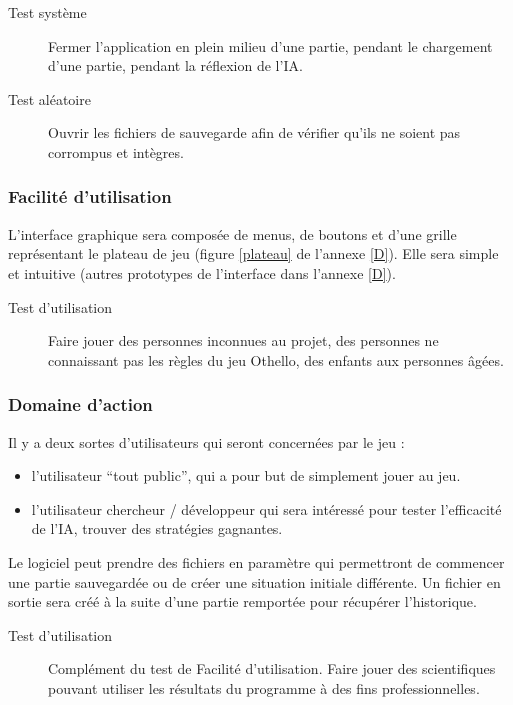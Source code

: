 \begin{description}
\item[Test système] Fermer l’application en plein milieu d’une partie, pendant le chargement d’une partie, pendant la réflexion de l’IA. 
\item[Test aléatoire] Ouvrir les fichiers de sauvegarde afin de vérifier qu’ils ne soient pas corrompus et intègres.
\end{description}

\subsubsection{Facilité d’utilisation}

L’interface graphique sera composée de menus, de boutons et d'une
grille représentant le plateau de jeu (figure \ref{plateau} de
l'annexe \ref{D}). Elle sera simple et intuitive
(autres prototypes de l'interface dans l'annexe \ref{D}).
 
\begin{description}
\item[Test d’utilisation] Faire jouer des personnes inconnues au projet, des personnes ne connaissant pas les règles du jeu Othello, des enfants aux personnes âgées. 
\end{description}

\subsubsection{Domaine d’action}

Il y a deux sortes d’utilisateurs qui seront concernées par le jeu :
\begin{itemize}
\item l'utilisateur ``tout public'', qui a pour but de simplement jouer au jeu.
\item l’utilisateur chercheur / développeur qui sera intéressé pour tester l’efficacité de l’IA, trouver des stratégies gagnantes.
\end{itemize}
Le logiciel peut prendre des fichiers en paramètre qui permettront de commencer une partie sauvegardée ou de créer une situation initiale différente. Un fichier en sortie sera créé à la suite d’une partie remportée pour récupérer l'historique.

\begin{description}
\item[Test d’utilisation] Complément du test de Facilité d’utilisation. Faire jouer des scientifiques pouvant utiliser les résultats du programme à des fins professionnelles.
\end{description}

